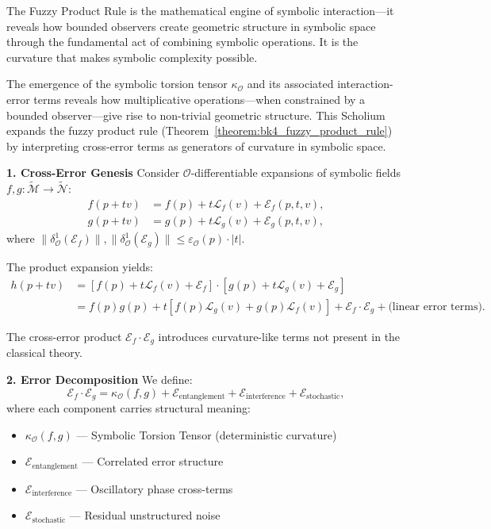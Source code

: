 The Fuzzy Product Rule is the mathematical engine of symbolic interaction—it reveals how bounded observers create geometric structure in symbolic space through the fundamental act of combining symbolic operations. It is the curvature that makes symbolic complexity possible.

\begin{scholium}
\label{scholium:bk4_higher_order_cross_error_structure}

The emergence of the symbolic torsion tensor $\kappa_{\mathcal{O}}$ and its associated interaction-error terms reveals how multiplicative operations—when constrained by a bounded observer—give rise to non-trivial geometric structure. This Scholium expands the fuzzy product rule (Theorem~\ref{theorem:bk4_fuzzy_product_rule}) by interpreting cross-error terms as generators of curvature in symbolic space.

\textbf{1. Cross-Error Genesis}
Consider $\mathcal{O}$-differentiable expansions of symbolic fields $f, g: \tilde{\mathcal{M}} \rightarrow \tilde{\mathcal{N}}$:
\begin{align}
    f(p + tv) &= f(p) + t\mathcal{L}_f(v) + \mathcal{E}_f(p,t,v), \\
    g(p + tv) &= g(p) + t\mathcal{L}_g(v) + \mathcal{E}_g(p,t,v),
\end{align}
where $\|\delta^1_{\mathcal{O}}(\mathcal{E}_f)\|, \|\delta^1_{\mathcal{O}}(\mathcal{E}_g)\| \leq \varepsilon_{\mathcal{O}}(p) \cdot |t|$.

The product expansion yields:
\begin{align}
    h(p+tv) &= [f(p) + t\mathcal{L}_f(v) + \mathcal{E}_f] \cdot [g(p) + t\mathcal{L}_g(v) + \mathcal{E}_g] \\
    &= f(p)g(p) + t[f(p)\mathcal{L}_g(v) + g(p)\mathcal{L}_f(v)] + \mathcal{E}_f \cdot \mathcal{E}_g + \text{(linear error terms)}.
\end{align}

The cross-error product $\mathcal{E}_f \cdot \mathcal{E}_g$ introduces curvature-like terms not present in the classical theory.

\textbf{2. Error Decomposition}
We define:
\[
\mathcal{E}_f \cdot \mathcal{E}_g = \kappa_{\mathcal{O}}(f,g) + \mathcal{E}_{\text{entanglement}} + \mathcal{E}_{\text{interference}} + \mathcal{E}_{\text{stochastic}},
\]
where each component carries structural meaning:
\begin{itemize}
    \item $\kappa_{\mathcal{O}}(f,g)$ — Symbolic Torsion Tensor (deterministic curvature)
    \item $\mathcal{E}_{\text{entanglement}}$ — Correlated error structure
    \item $\mathcal{E}_{\text{interference}}$ — Oscillatory phase cross-terms
    \item $\mathcal{E}_{\text{stochastic}}$ — Residual unstructured noise
\end{itemize}


\end{scholium}
